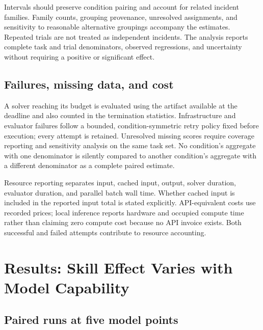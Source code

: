 \documentclass[11pt]{article}
\begin{document}
Intervals should preserve condition pairing and account for related incident families.
Family counts, grouping provenance, unresolved assignments, and sensitivity to reasonable alternative groupings accompany the estimates.
Repeated trials are not treated as independent incidents.
The analysis reports complete task and trial denominators, observed regressions, and uncertainty without requiring a positive or significant effect.

\subsection{Failures, missing data, and cost}
\label{sec:cost}

A solver reaching its budget is evaluated using the artifact available at the deadline and also counted in the termination statistics.
Infrastructure and evaluator failures follow a bounded, condition-symmetric retry policy fixed before execution; every attempt is retained.
Unresolved missing scores require coverage reporting and sensitivity analysis on the same task set.
No condition's aggregate with one denominator is silently compared to another condition's aggregate with a different denominator as a complete paired estimate.

Resource reporting separates input, cached input, output, solver duration, evaluator duration, and parallel batch wall time.
Whether cached input is included in the reported input total is stated explicitly.
API-equivalent costs use recorded prices; local inference reports hardware and occupied compute time rather than claiming zero compute cost because no API invoice exists.
Both successful and failed attempts contribute to resource accounting.

\section{Results: Skill Effect Varies with Model Capability}
\label{sec:results}

\subsection{Paired runs at five model points}
\label{sec:paired}
\end{document}

